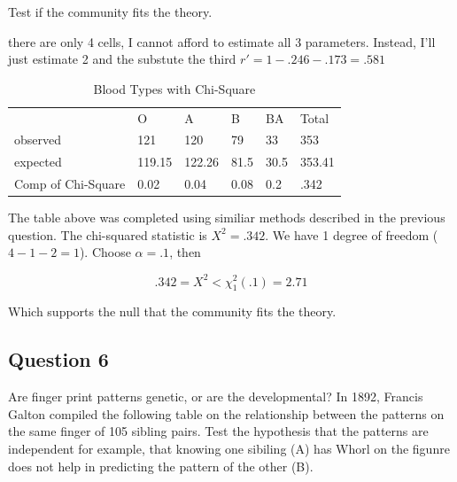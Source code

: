 \documentclass{tufte-book}
\theoremstyle{mytheoremstyle}
\theoremstyle{mylemstyle}
\theoremstyle{mydefstyle}
\begin{document}
Test if the community fits the theory. 

 there are only 4 cells, I cannot afford to estimate all 3 parameters.  Instead, I'll just estimate 2 and the substute the third $r'= 1- .246 -.173 = .581$



\begin{table}
\centering
\caption{Blood Types with Chi-Square}
\label{blod2}
\begin{tabular}{l|lllll}
                   & O      & A      & B    & BA   & Total  \\ \cline{2-6}
observed           & 121    & 120    & 79   & 33   & 353    \\
expected           & 119.15 & 122.26 & 81.5 & 30.5 & 353.41 \\
Comp of Chi-Square &0.02&0.04&0.08&0.2&.342\\
\end{tabular}
\end{table}

The table above was completed using similiar methods described in the previous question.  The chi-squared statistic is $X^2 = .342$.  We have 1 degree of freedom ($4-1-2 = 1$).  Choose $\alpha=.1$, then

\[ .342 = X^2 < \chi_1^2(.1) = 2.71 \]

Which supports the null that the community fits the theory.


\subsection{Question 6}
Are finger print patterns genetic, or are the developmental?  In 1892, Francis Galton compiled the following table on the relationship between the patterns on the same finger of 105 sibling pairs.  Test the hypothesis that the patterns are independent for example, that knowing one sibiling (A) has Whorl on the figunre does not help in predicting the pattern of the other (B).
\end{document}
